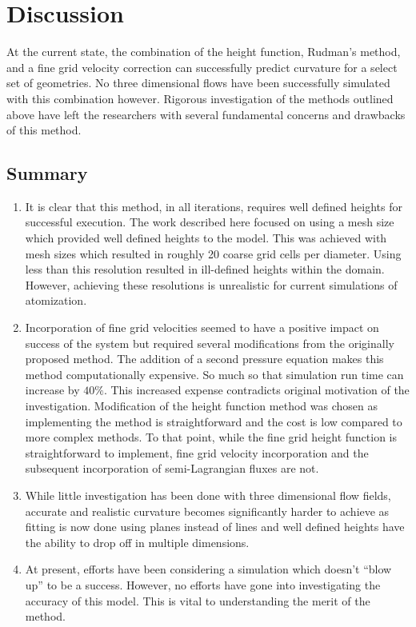 \chapter{Discussion}  
At the current state, the combination of the height function, Rudman's method, and a fine grid velocity correction can successfully predict curvature for a select set of geometries. No three dimensional flows have been successfully simulated with this combination however. Rigorous investigation of the methods outlined above have left the researchers with several fundamental concerns and drawbacks of this method.
\section{Summary}
\begin{enumerate}
	\item It is clear that this method, in all iterations, requires well defined heights for successful execution. The work described here focused on using a mesh size which provided well defined heights to the model. This was achieved with mesh sizes which resulted in roughly 20 coarse grid cells per diameter. Using less than this resolution resulted in ill-defined heights within the domain. However, achieving these resolutions is unrealistic for current simulations of atomization.  
	\item Incorporation of fine grid velocities seemed to have a positive impact on success of the system but required several modifications from the originally proposed method. The addition of a second pressure equation makes this method computationally expensive. So much so that simulation run time can increase by $40\%$. This increased expense contradicts original motivation of the investigation. Modification of the height function method was chosen as implementing the method is straightforward and the cost is low compared to more complex methods. To that point, while the fine grid height function is straightforward to implement, fine grid velocity incorporation and the subsequent incorporation of semi-Lagrangian fluxes are not. 
	\item While little investigation has been done with three dimensional flow fields, accurate and realistic curvature becomes significantly harder to achieve as fitting is now done using planes instead of lines and well defined heights have the ability to drop off in multiple dimensions.
	\item At present, efforts have been considering a simulation which doesn't ``blow up'' to be a success. However, no efforts have gone into investigating the accuracy of this model. This is vital to understanding the merit of the method. 
\end{enumerate} 

